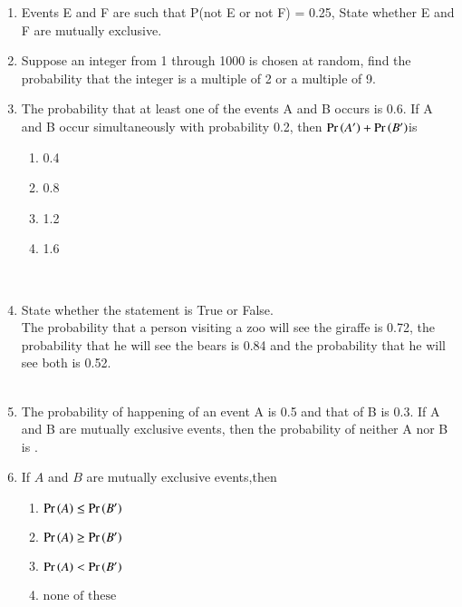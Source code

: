 \begin{enumerate}[label=\thesection.\arabic*,ref=\thesection.\theenumi]
\item Events E and F are such that P(not E or not F) = 0.25, State whether E and F are
mutually exclusive.

\item Suppose an integer from 1 through 1000 is chosen at random, find the probability that the integer is a multiple of 2 or a multiple of 9.

\item The probability that at least one of the events A and B occurs is 0.6. If A and B occur simultaneously with probability 0.2, then $\Pr\left(A^\prime\right)+\Pr\left(B^\prime\right) $is\\
\begin{enumerate}
\item 0.4\\
\item 0.8\\
\item 1.2\\
\item 1.6\\
\end{enumerate}
\solution \\

\item State whether the statement is True or False.\\
The probability that a person visiting a zoo will see the giraffe is 0.72, the probability that he will see the bears is 0.84 and the probability that he will see both is 0.52.\\
\solution
\\

\item The probability of happening of an event A is 0.5 and that of B is 0.3. If A and B are mutually exclusive events, then the probability of neither A nor B is \underline{\phantom{Blank}}.
	\\	
\item If $A$ and $B$ are mutually exclusive events,then
\begin{enumerate}
\item $\Pr\left(A\right) \leq\Pr\left(B^\prime\right)$\\
\item $\Pr\left(A\right) \geq \Pr\left(B^\prime\right)$\\
\item $\Pr\left(A\right) < \Pr\left(B^\prime\right)$\\
\item $\text{none of these}$
\end{enumerate}

\end{enumerate}
